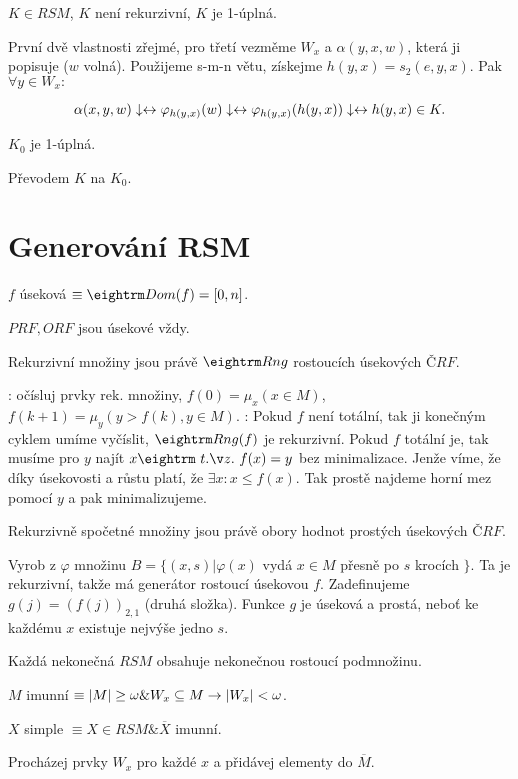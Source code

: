  $K \in RSM$, $K$ není rekurzivní, $K$ je 1-úplná.

\prf{} První dvě vlastnosti zřejmé, pro třetí vezměme $W_x$ a $\alpha(y,x,w)$,
která ji popisuje ($w$ volná). Použijeme s-m-n větu, získejme $h(y,x) = s_2(e,y,x)$. Pak
$\forall y \in W_x:$

$$ \alpha(x,y,w)\downarrow \leftrightarrow \varphi_{h(y,x)}(w)\downarrow \leftrightarrow  \varphi_{h(y,x)}(h(y,x))\downarrow \leftrightarrow h(y,x) \in K.$$

 $K_0$ je 1-úplná.

\prf{} Převodem $K$ na $K_0$.

\section{Generování RSM}

\dfn{} $f$ úseková $\equiv \dom(f) = [0,n]$.

\obs{} $PRF, ORF$ jsou úsekové vždy.

 Rekurzivní množiny jsou právě $\rng$ rostoucích úsekových $ČRF$. 

\prf{}

\itemize\ibull
\: \uv{$\then$}: očísluj prvky rek. množiny, $f(0) = \mu_x(x \in M)$, $f(k+1) = \mu_y(y > f(k), y \in M)$.
\: \uv{$\leftarrow$}: Pokud $f$ není totální, tak ji konečným cyklem umíme
vyčíslit, $\rng(f)$ je rekurzivní.  Pokud $f$ totální je, tak musíme pro $y$
najít $x \st f(x) = y$ bez minimalizace. Jenže víme, že díky úsekovosti a růstu
platí, že $\exists x: x \le f(x)$. Tak prostě najdeme horní mez pomocí $y$ a
pak minimalizujeme.
\endlist

\thm{} Rekurzivně spočetné množiny jsou právě obory hodnot prostých úsekových $ČRF$.

\prf{} Vyrob z $\varphi$ množinu $B = \{(x,s) | \varphi(x)$ vydá $x \in M$ přesně po $s$ krocích $\}$.
Ta je rekurzivní, takže má generátor rostoucí úsekovou $f$. Zadefinujeme $g(j) = (f(j))_{2,1}$
(druhá složka). Funkce $g$ je úseková a prostá, neboť ke každému $x$ existuje nejvýše jedno $s$.

\thm{} Každá nekonečná $RSM$ obsahuje nekonečnou rostoucí podmnožinu.
 

\dfn{} $M$ imunní $\equiv |M| \ge \omega \& W_x \subseteq M \rightarrow |W_x| < \omega$. 

\dfn{} $X$ simple $\equiv X \in RSM \& \overline{X}$ imunní.

 Procházej prvky $W_x$ pro každé $x$ a přidávej elementy do $\overline{M}$.

